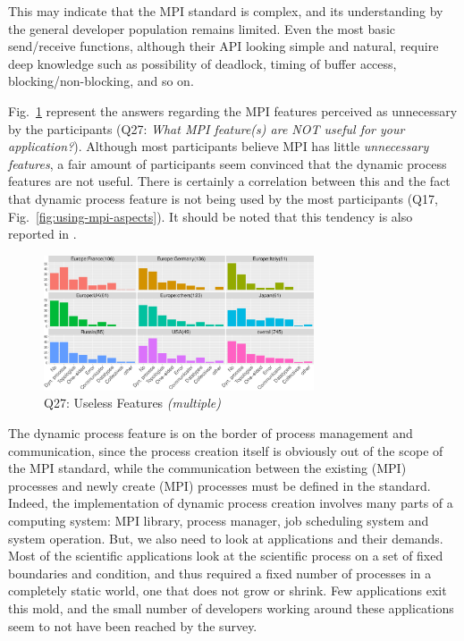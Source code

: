 \documentclass[preprint,5p,times]{elsarticle}
\def\myquote#1{{\it #1}}
\newcommand{\revision}[2]{{\color{blue}#2}}
\begin{document}
This may indicate that the MPI standard is complex, and its understanding by the
general developer population remains limited. Even the most basic send/receive
functions, although their API looking simple and natural, require deep knowledge
such as possibility of deadlock, timing of buffer access, blocking/non-blocking,
and so on.

Fig.~\ref{fig:useless-features} represent the answers regarding the MPI features
perceived as unnecessary by the participants (Q27: \myquote{What MPI feature(s)
are NOT useful for your application?}). Although most participants believe MPI
has little {\it unnecessary features}, a fair amount of participants seem
convinced that the dynamic process features are not useful. There is certainly a
correlation between this and the fact that dynamic process feature is not being
used by the most participants (Q17, Fig.~\ref{fig:using-mpi-aspects}). It should
be noted that this tendency is also reported in \cite{10.1145/3295500.3356176}.

\begin{figure}[tb]
  \begin{center}
    \includegraphics[width=8.0cm]{R-scripts/Q27.pdf}
    \caption{Q27: Useless Features {\it(multiple)}}
    \label{fig:useless-features}
\vspace{-3mm}%
  \end{center}
\end{figure}

The dynamic process feature is on the border of process management and
communication, since the process creation itself is obviously out of the scope
of the MPI standard, while the communication between the existing (MPI)
processes and newly create (MPI) processes must be defined in the standard.
Indeed, the implementation of dynamic process creation \revision{spreads}{involves} many parts of a
computing system: MPI library, process manager, job scheduling system and system
operation.
%
But, we also need to look at applications and their demands. Most of the
scientific applications look at the scientific process on a set of fixed
boundaries and condition, and thus required a fixed number of processes in a
completely static world, one that does not grow or shrink. Few applications exit
this mold, and the small number of developers working around these applications
seem to not have been reached by the survey.
\end{document}
